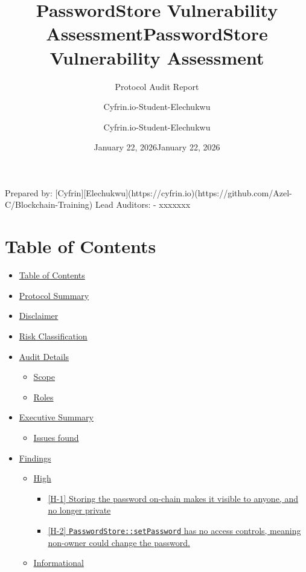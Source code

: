 \documentclass[
  paper=a4,
  ,captions=tableheading
]{scrartcl}
\title{PasswordStore Vulnerability Assessment}
\subtitle{Protocol Audit Report}
\author{Cyfrin.io-Student-Elechukwu}
\date{January 22, 2026}
\title{PasswordStore Vulnerability Assessment}
\author{Cyfrin.io-Student-Elechukwu}
\date{January 22, 2026}
\providecommand{\tightlist}{%
  \setlength{\itemsep}{0pt}\setlength{\parskip}{0pt}}
\begin{document}




Prepared by:
{[}Cyfrin{]}{[}Elechukwu{]}(https://cyfrin.io)(https://github.com/Azel-C/Blockchain-Training)
Lead Auditors: - xxxxxxx

\section{Table of Contents}\label{table-of-contents}

\begin{itemize}
\tightlist
\item
  \hyperref[table-of-contents]{Table of Contents}
\item
  \hyperref[protocol-summary]{Protocol Summary}
\item
  \hyperref[disclaimer]{Disclaimer}
\item
  \hyperref[risk-classification]{Risk Classification}
\item
  \hyperref[audit-details]{Audit Details}

  \begin{itemize}
  \tightlist
  \item
    \hyperref[scope]{Scope}
  \item
    \hyperref[roles]{Roles}
  \end{itemize}
\item
  \hyperref[executive-summary]{Executive Summary}

  \begin{itemize}
  \tightlist
  \item
    \hyperref[issues-found]{Issues found}
  \end{itemize}
\item
  \hyperref[findings]{Findings}

  \begin{itemize}
  \tightlist
  \item
    \hyperref[high]{High}

    \begin{itemize}
    \tightlist
    \item
      \hyperref[h-1-storing-the-password-on-chain-makes-it-visible-to-anyone-and-no-longer-private]{{[}H-1{]}
      Storing the password on-chain makes it visible to anyone, and no
      longer private}
    \item
      \hyperref[h-2-passwordstoresetpassword-has-no-access-controls-meaning-non-owner-could-change-the-password]{{[}H-2{]}
      \texttt{PasswordStore::setPassword} has no access controls,
      meaning non-owner could change the password.}
    \end{itemize}
  \item
    \hyperref[informational]{Informational}


\end{itemize}
\end{itemize}
\end{document}
